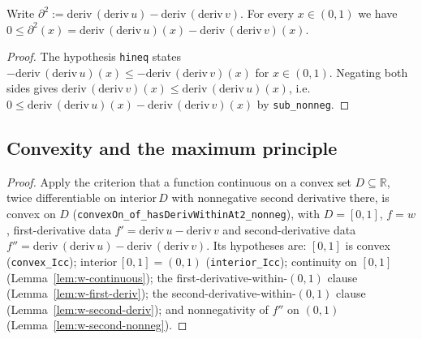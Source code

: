 \begin{lemma}
    \label{lem:w-second-nonneg}
    \leanok
    Write $\partial^2 := \mathrm{deriv}\,(\mathrm{deriv}\,u) -
    \mathrm{deriv}\,(\mathrm{deriv}\,v)$. For every $x \in (0,1)$ we have
    $0 \le \partial^2(x) = \mathrm{deriv}\,(\mathrm{deriv}\,u)(x) -
    \mathrm{deriv}\,(\mathrm{deriv}\,v)(x)$.
\end{lemma}
\begin{proof}
    The hypothesis \texttt{hineq} states $-\mathrm{deriv}\,(\mathrm{deriv}\,u)(x)
    \le -\mathrm{deriv}\,(\mathrm{deriv}\,v)(x)$ for $x \in (0,1)$. Negating both
    sides gives $\mathrm{deriv}\,(\mathrm{deriv}\,v)(x) \le
    \mathrm{deriv}\,(\mathrm{deriv}\,u)(x)$, i.e.
    $0 \le \mathrm{deriv}\,(\mathrm{deriv}\,u)(x) -
    \mathrm{deriv}\,(\mathrm{deriv}\,v)(x)$ by \texttt{sub\_nonneg}.
\end{proof}

\subsection{Convexity and the maximum principle}

\begin{proof}
    Apply the criterion that a function continuous on a convex set
    $D \subseteq {}$, twice differentiable on $\,D$ with
    nonnegative second derivative there, is convex on $D$
    (\texttt{convexOn\_of\_hasDerivWithinAt2\_nonneg}), with $D = [0,1]$,
    $f = w$, first-derivative data $f' = \,u - \,v$
    and second-derivative data $f'' = \,(\,u) -
    \,(\,v)$. Its hypotheses are: $[0,1]$ is convex
    (\texttt{convex\_Icc}); $\,[0,1] = (0,1)$
    (\texttt{interior\_Icc}); continuity on $[0,1]$
    (Lemma~\ref{lem:w-continuous}); the first-derivative-within-$(0,1)$ clause
    (Lemma~\ref{lem:w-first-deriv}); the second-derivative-within-$(0,1)$ clause
    (Lemma~\ref{lem:w-second-deriv}); and nonnegativity of $f''$ on $(0,1)$
    (Lemma~\ref{lem:w-second-nonneg}).
\end{proof}


